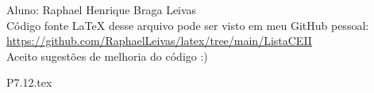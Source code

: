 \documentclass[12pt]{scrartcl}
\begin{document}
Aluno: Raphael Henrique Braga Leivas \\[20pt]
Código fonte LaTeX desse arquivo pode ser visto em meu GitHub pessoal: \\[10pt]
\href{https://github.com/RaphaelLeivas/latex/tree/main/ListaCEII}{https://github.com/RaphaelLeivas/latex/tree/main/ListaCEII} \\[20pt]
Aceito sugestões de melhoria do código :) 

{P7.12.tex}

\end{document}
